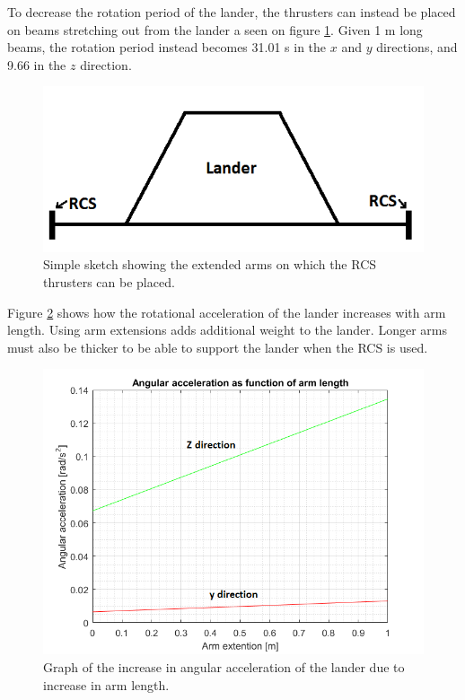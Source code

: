 To decrease the rotation period of the lander, the thrusters can instead be placed on beams stretching out from the lander a seen on figure \ref{fig:arms}. Given 1 m long beams, the rotation period instead becomes 31.01 s in the $x$ and $y$ directions, and 9.66 in the $z$ direction.

\begin{figure}[htb]
\begin{center}
\includegraphics[scale=0.8]{figures/RCS/Lunar_arms}
\caption{Simple sketch showing the extended arms on which the RCS thrusters can be placed.}
\label{fig:arms}
\end{center}
\end{figure}

Figure \ref{fig:arms_graph} shows how the rotational acceleration of the lander increases with arm length. Using arm extensions adds additional weight to the lander. Longer arms must also  be thicker to be able to support the lander when the RCS is used.

\begin{figure}[htb]
\begin{center}
\includegraphics[scale=0.8]{figures/RCS/arm_graph}
\caption{Graph of the increase in angular acceleration of the lander due to increase in arm length.}
\label{fig:arms_graph}
\end{center}
\end{figure}

